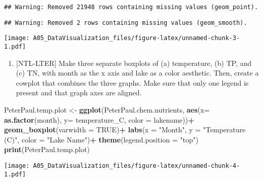 \documentclass[]{article}
\newenvironment{Shaded}{\begin{snugshade}}{\end{snugshade}}
\newcommand{\DataTypeTok}[1]{\textcolor[rgb]{0.13,0.29,0.53}{#1}}
\newcommand{\KeywordTok}[1]{\textcolor[rgb]{0.13,0.29,0.53}{\textbf{#1}}}
\newcommand{\NormalTok}[1]{#1}
\newcommand{\OperatorTok}[1]{\textcolor[rgb]{0.81,0.36,0.00}{\textbf{#1}}}
\newcommand{\OtherTok}[1]{\textcolor[rgb]{0.56,0.35,0.01}{#1}}
\newcommand{\StringTok}[1]{\textcolor[rgb]{0.31,0.60,0.02}{#1}}
\providecommand{\tightlist}{%
  \setlength{\itemsep}{0pt}\setlength{\parskip}{0pt}}
\begin{document}
\begin{verbatim}
## Warning: Removed 21948 rows containing missing values (geom_point).
\end{verbatim}

\begin{verbatim}
## Warning: Removed 2 rows containing missing values (geom_smooth).
\end{verbatim}

\texttt{[image: A05\_DataVisualization\_files/figure-latex/unnamed-chunk-3-1.pdf]}

\begin{enumerate}
\def\labelenumi{\arabic{enumi}.}
\setcounter{enumi}{4}
\tightlist
\item
  {[}NTL-LTER{]} Make three separate boxplots of (a) temperature, (b)
  TP, and (c) TN, with month as the x axis and lake as a color
  aesthetic. Then, create a cowplot that combines the three graphs. Make
  sure that only one legend is present and that graph axes are aligned.
\end{enumerate}

\begin{Shaded}
\begin{Highlighting}[]
\NormalTok{PeterPaul.temp.plot <-}
\StringTok{  }\KeywordTok{ggplot}\NormalTok{(PeterPaul.chem.nutrients, }\KeywordTok{aes}\NormalTok{(}\DataTypeTok{x=} \KeywordTok{as.factor}\NormalTok{(month), }\DataTypeTok{y=}\NormalTok{ temperature_C, }\DataTypeTok{color =}\NormalTok{ lakename))}\OperatorTok{+}
\StringTok{  }\KeywordTok{geom_boxplot}\NormalTok{(}\DataTypeTok{varwidth =} \OtherTok{TRUE}\NormalTok{)}\OperatorTok{+}
\StringTok{  }\KeywordTok{labs}\NormalTok{(}\DataTypeTok{x =} \StringTok{"Month"}\NormalTok{, }\DataTypeTok{y =} \StringTok{"Temperature (C)"}\NormalTok{, }\DataTypeTok{color =} \StringTok{"Lake Name"}\NormalTok{)}\OperatorTok{+}
\StringTok{  }\KeywordTok{theme}\NormalTok{(}\DataTypeTok{legend.position =} \StringTok{"top"}\NormalTok{)}
\KeywordTok{print}\NormalTok{(PeterPaul.temp.plot)}
\end{Highlighting}
\end{Shaded}

\texttt{[image: A05\_DataVisualization\_files/figure-latex/unnamed-chunk-4-1.pdf]}
\end{document}
